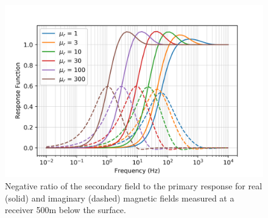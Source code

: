 \begin{figure}
    \begin{center}
    \includegraphics[width=0.6\columnwidth]{figures/casing_software/augustin_response_function_mu.png}
    \end{center}
\caption{Negative ratio of the secondary field to the primary response for real (solid) and imaginary (dashed) magnetic fields measured at a receiver 500m below the surface.}
\label{fig:augustin_response_function_mu}
\end{figure}
